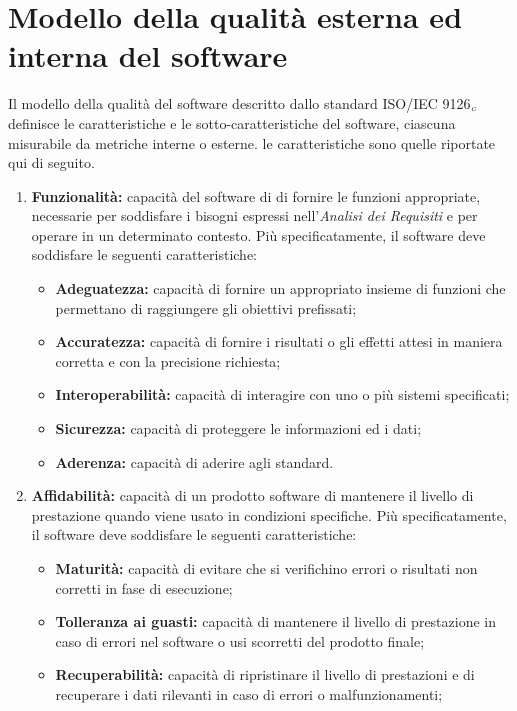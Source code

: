 \section{Modello della qualità esterna ed interna del software}\label{StandardISO/IEC9126ModelloDellaQualitàEsternaEdInternaDelSoftware}
Il modello della qualità del software descritto dallo standard ISO/IEC 9126$_{\scaleto{G}{3pt}}$ definisce le caratteristiche e le sotto-caratteristiche del software, ciascuna misurabile da metriche interne o esterne. le caratteristiche sono quelle riportate qui di seguito.
\begin{enumerate}
	\item \textbf{Funzionalità:} capacità del software di di fornire le funzioni appropriate, necessarie per soddisfare i bisogni espressi nell'\textit{Analisi dei Requisiti} e per operare in un determinato contesto. Più specificatamente, il software deve soddisfare le seguenti caratteristiche:  
 	\begin{itemize}
 		\item \textbf{Adeguatezza:} capacità di fornire un appropriato insieme di funzioni che permettano di raggiungere gli obiettivi prefissati;
 		\item \textbf{Accuratezza:} capacità di fornire i risultati o gli effetti attesi in maniera corretta e con la precisione richiesta;
 		\item \textbf{Interoperabilità:} capacità di interagire con uno o più sistemi specificati;
 		\item \textbf{Sicurezza:} capacità di proteggere le informazioni ed i dati;
 		\item \textbf{Aderenza:} capacità di aderire agli standard.
 	\end{itemize}
 	\item \textbf{Affidabilità:} capacità di un prodotto software di mantenere il livello di prestazione quando viene usato in condizioni specifiche. Più specificatamente, il software deve soddisfare le seguenti caratteristiche: 
 	\begin{itemize}
 		\item \textbf{Maturità:} capacità di evitare che si verifichino errori o risultati non corretti in fase di esecuzione;
 		\item \textbf{Tolleranza ai guasti:} capacità di mantenere il livello di prestazione in caso di errori nel software o usi scorretti del prodotto finale;
 		\item \textbf{Recuperabilità:} capacità di ripristinare il livello di prestazioni e di recuperare i dati rilevanti in caso di errori o malfunzionamenti;

\end{itemize}
\end{enumerate}
